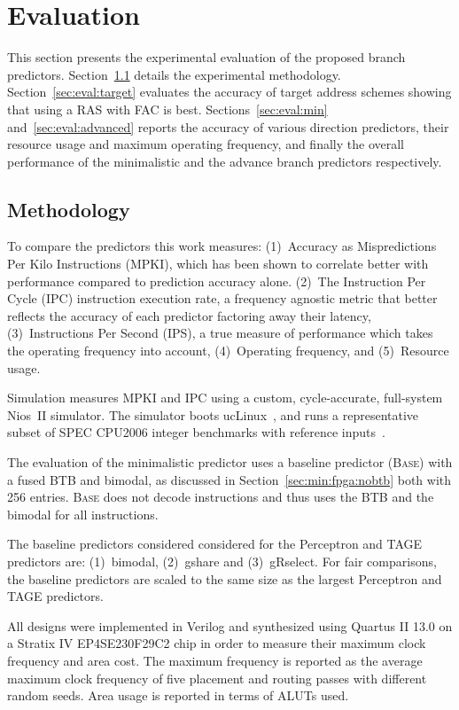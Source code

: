 \chapter{Evaluation}
\label{chap:eval}

This section presents the experimental evaluation of the proposed branch predictors.
Section~\ref{sec:eval:methodology} details the experimental methodology. Section~\ref{sec:eval:target} evaluates the accuracy of target address schemes showing that using a RAS with FAC is best. Sections~\ref{sec:eval:min} and~\ref{sec:eval:advanced} reports the accuracy of various direction predictors, their resource usage and maximum operating frequency, and finally the overall performance of the minimalistic and the advance branch predictors respectively.

\section{Methodology}
\label{sec:eval:methodology}
To compare the predictors this work measures: (1)~Accuracy as Mispredictions Per Kilo Instructions (MPKI), which has been shown to correlate better with performance compared to prediction accuracy alone. (2)~The Instruction Per Cycle (IPC) instruction execution rate, a frequency agnostic metric that better reflects the accuracy of each predictor factoring away their latency, (3)~Instructions Per Second (IPS), a true measure of performance which takes the operating frequency into account, (4)~Operating frequency, and (5)~Resource usage.

Simulation measures MPKI and IPC using a custom, cycle-accurate, full-system Nios~II simulator. The simulator boots ucLinux~\cite{uclinux}, and runs a representative subset of SPEC CPU2006 integer benchmarks with reference inputs~\cite{spec2k6}.

The evaluation of the minimalistic predictor uses a baseline predictor (\textsc{Base}) with a fused BTB and bimodal, as discussed in Section~\ref{sec:min:fpga:nobtb} both with 256 entries. \textsc{Base} does not decode instructions and thus uses the BTB and the bimodal for all instructions.

The baseline predictors considered considered for the Perceptron and TAGE predictors are: (1)~bimodal, (2)~gshare and (3)~gRselect. For fair comparisons, the baseline predictors are scaled to the same size as the largest Perceptron and TAGE predictors.

All designs were implemented in Verilog and synthesized using Quartus II 13.0 on a Stratix IV EP4SE230F29C2 chip in order to measure their maximum clock frequency and area cost. The maximum frequency is reported as the average maximum clock frequency of five placement and routing passes with different random seeds. Area usage is reported in terms of ALUTs used.

